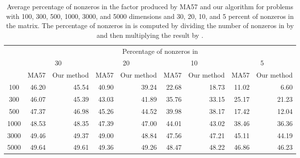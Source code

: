 \documentclass{article}
\begin{document}
\begin{table}
\caption{Average percentage of nonzeros in the factor  produced by MA57 and our algorithm for problems with 100, 300, 500, 1000, 3000, and 5000 dimensions and 30, 20, 10, and 5 percent of nonzeros in the matrix.  The percentage of nonzeros in  is computed by dividing the number of nonzeros in  by  and then multiplying the result by .}\label{table1}
\begin{tabular}{|c|r|r|r|r|r|r|r|r|}
\hline
\multirow{3}{*}{} 
&\multicolumn{8}{c|}{Percentage of nonzeros in }\\
\cline{2-9}
&\multicolumn{2}{c|}{30}
&\multicolumn{2}{c|}{20}
&\multicolumn{2}{c|}{10}
&\multicolumn{2}{c|}{5}\\
\cline{2-9}
&MA57
&Our method
&MA57
&Our method
&MA57
&Our method
&MA57
&Our method\\
\hline
100&46.20&45.54&40.90&39.24&22.68&18.73&11.02&6.60\\
300&46.07&45.39&43.03&41.89&35.76&33.15&25.17&21.23\\
500&47.37&46.98&45.26&44.52&39.98&38.17&17.42&12.04\\
1000&48.53&48.35&47.39&47.00&44.01&43.02&38.46&36.36\\
3000&49.46&49.37&49.00&48.84&47.56&47.21&45.11&44.19\\
5000&49.64&49.61&49.36&49.26&48.47&48.22&46.86&46.23\\
\hline
\end{tabular}
\end{table}
\end{document}
